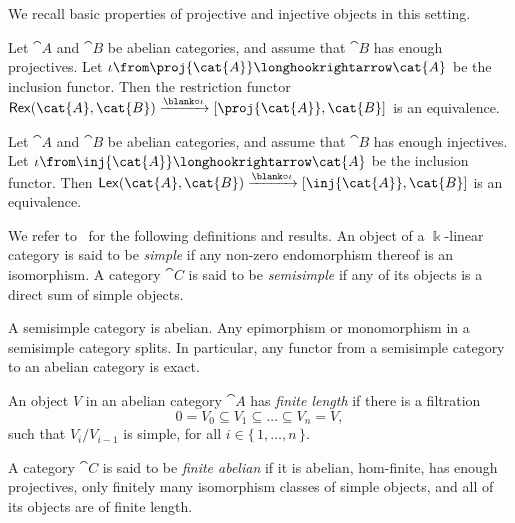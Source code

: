 We recall basic properties of projective and injective objects in this setting.

\begin{proposition}\label{prop:right exact-is-enough-on-projectives}
  Let \(\cat{A}\) and \(\cat{B}\) be abelian categories,
  and assume that \(\cat{B}\) has enough projectives.
  Let \(\iota\from \proj{\cat{A}} \longhookrightarrow \cat{A}\) be the inclusion functor.
  Then the restriction functor \(\mathsf{Rex}(\cat{A}, \cat{B}) \xrightarrow{\blank \circ \iota} [\proj{\cat{A}}, \cat{B}]\) is an equivalence.
\end{proposition}

\begin{proposition}\label{prop:left exact-is-enough-on-injectives}
  Let \(\cat{A}\) and \(\cat{B}\) be abelian categories,
  and assume that \(\cat{B}\) has enough injectives.
  Let \(\iota\from \inj{\cat{A}} \longhookrightarrow \cat{A}\) be the inclusion functor.
  Then \(\mathsf{Lex}(\cat{A},\cat{B}) \xrightarrow{\blank \circ \iota} [\inj{\cat{A}}, \cat{B}]\) is an equivalence.
\end{proposition}

We refer to~\cite[Chapter~1]{Etingof2015} for the following definitions and results.
An object of a \(\Bbbk\)\hyp{}linear category is said to be \emph{simple} if any non-zero endomorphism thereof is an isomorphism.
A category \(\cat{C}\) is said to be \emph{semisimple} if any of its objects is a direct sum of simple objects.

\begin{proposition}\label{toomuchTV}
  A semisimple category is abelian.
  Any epimorphism or monomorphism in a semisimple category splits.
  In particular, any functor from a semisimple category to an abelian category is exact.
\end{proposition}

An object \(V\) in an abelian category \(\cat{A}\) has \emph{finite length} if there is a filtration
\[
  0 = V_0 \subseteq V_1 \subseteq \dots \subseteq V_n = V,
\]
such that \(V_i/V_{i-1}\) is simple, for all \(i \in \{\, 1, \dots, n \,\}\).

\begin{definition}\label{def:finite-abelian-category}
  A category \(\cat{C}\) is said to be \emph{finite abelian} if
  it is abelian,
  hom-finite,
  has enough projectives,
  only finitely many isomorphism classes of simple objects, and
  all of its objects are of finite length.
\end{definition}

